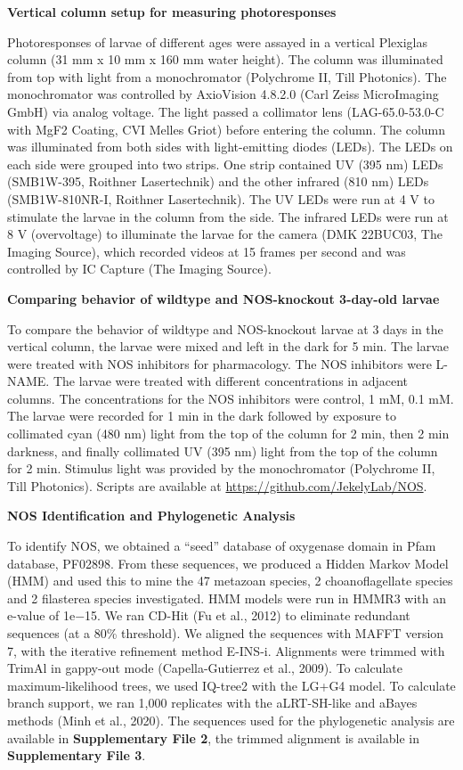 \documentclass[
  10pt,
  onecolumn]{article}
\begin{document}
\textbf{Vertical column setup for measuring photoresponses}

Photoresponses of larvae of different ages were assayed in a vertical
Plexiglas column (31 mm x 10 mm x 160 mm water height). The column was
illuminated from top with light from a monochromator (Polychrome II,
Till Photonics). The monochromator was controlled by AxioVision 4.8.2.0
(Carl Zeiss MicroImaging GmbH) via analog voltage. The light passed a
collimator lens (LAG-65.0-53.0-C with MgF2 Coating, CVI Melles Griot)
before entering the column. The column was illuminated from both sides
with light-emitting diodes (LEDs). The LEDs on each side were grouped
into two strips. One strip contained UV (395 nm) LEDs (SMB1W-395,
Roithner Lasertechnik) and the other infrared (810 nm) LEDs
(SMB1W-810NR-I, Roithner Lasertechnik). The UV LEDs were run at 4 V to
stimulate the larvae in the column from the side. The infrared LEDs were
run at 8 V (overvoltage) to illuminate the larvae for the camera (DMK
22BUC03, The Imaging Source), which recorded videos at 15 frames per
second and was controlled by IC Capture (The Imaging Source).

\textbf{Comparing behavior of wildtype and NOS-knockout 3-day-old
larvae}

To compare the behavior of wildtype and NOS-knockout larvae at 3 days in
the vertical column, the larvae were mixed and left in the dark for 5
min. The larvae were treated with NOS inhibitors for pharmacology. The
NOS inhibitors were L-NAME. The larvae were treated with different
concentrations in adjacent columns. The concentrations for the NOS
inhibitors were control, 1 mM, 0.1 mM. The larvae were recorded for 1
min in the dark followed by exposure to collimated cyan (480 nm) light
from the top of the column for 2 min, then 2 min darkness, and finally
collimated UV (395 nm) light from the top of the column for 2 min.
Stimulus light was provided by the monochromator (Polychrome II, Till
Photonics). Scripts are available at
\url{https://github.com/JekelyLab/NOS}.

\textbf{NOS Identification and Phylogenetic Analysis}

To identify NOS, we obtained a ``seed'' database of oxygenase domain in
Pfam database, PF02898. From these sequences, we produced a Hidden
Markov Model (HMM) and used this to mine the 47 metazoan species, 2
choanoflagellate species and 2 filasterea species investigated. HMM
models were run in HMMR3 with an e-value of 1e−15. We ran CD-Hit (Fu et
al., 2012) to eliminate redundant sequences (at a 80\% threshold). We
aligned the sequences with MAFFT version 7, with the iterative
refinement method E-INS-i. Alignments were trimmed with TrimAl in
gappy-out mode (Capella-Gutierrez et al., 2009). To calculate
maximum-likelihood trees, we used IQ-tree2 with the LG+G4 model. To
calculate branch support, we ran 1,000 replicates with the aLRT-SH-like
and aBayes methods (Minh et al., 2020). The sequences used for the
phylogenetic analysis are available in \textbf{Supplementary File 2},
the trimmed alignment is available in \textbf{Supplementary File 3}.
\end{document}

